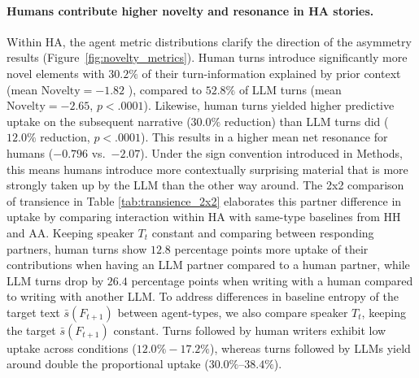 \documentclass[11pt]{article}
\begin{document}
\paragraph{Humans contribute higher novelty and resonance in HA stories.}
Within HA, the agent metric distributions clarify the direction of the asymmetry results (Figure~\ref{fig:novelty_metrics}). Human turns introduce significantly more novel elements with $30.2\%$ of their turn-information explained by prior context (mean $\text{Novelty} = -1.82$ ), compared to $52.8\%$ of LLM turns  (mean $\text{Novelty} = -2.65$,  $p < .0001$). Likewise, human turns yielded higher predictive uptake on the subsequent narrative ($30.0\%$ reduction) than LLM turns did ($12.0\%$ reduction, $p<.0001$). This results in a higher mean net resonance for humans ($-0.796$ vs.\ $-2.07$). Under the sign convention introduced in Methods, this means humans introduce more contextually surprising material that is more strongly taken up by the LLM than the other way around. The 2x2 comparison of transience in Table \ref{tab:transience_2x2} elaborates this partner difference in uptake by comparing interaction within HA with same-type baselines from HH and AA. 
Keeping speaker $T_t$ constant and comparing between responding partners, human turns show $12.8$ percentage points more uptake of their contributions when having an LLM partner compared to a human partner, while LLM turns drop by $26.4$ percentage points when writing with a human compared to writing with another LLM.
To address differences in baseline entropy of the target text $\bar{s}(F_{t+1})$ between agent-types, we also compare speaker $T_t$, keeping the target $\bar{s}(F_{t+1})$ constant. Turns followed by human writers exhibit low uptake across conditions ($12.0\% - 17.2\%$), whereas turns followed by LLMs yield around double the proportional uptake ($30.0\%$--$38.4\%$). 
\end{document}

